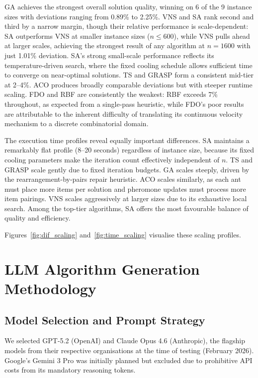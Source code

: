 \documentclass[11pt]{article}
\begin{document}
GA achieves the strongest overall solution quality, winning on 6 of the 9 instance sizes with deviations ranging from 0.89\% to 2.25\%. VNS and SA rank second and third by a narrow margin, though their relative performance is scale-dependent: SA outperforms VNS at smaller instance sizes ($n \leq 600$), while VNS pulls ahead at larger scales, achieving the strongest result of any algorithm at $n = 1600$ with just 1.01\% deviation. SA's strong small-scale performance reflects its temperature-driven search, where the fixed cooling schedule allows sufficient time to converge on near-optimal solutions. TS and GRASP form a consistent mid-tier at 2--4\%. ACO produces broadly comparable deviations but with steeper runtime scaling. FDO and RBF are consistently the weakest: RBF exceeds 7\% throughout, as expected from a single-pass heuristic, while FDO's poor results are attributable to the inherent difficulty of translating its continuous velocity mechanism to a discrete combinatorial domain.

The execution time profiles reveal equally important differences. SA maintains a remarkably flat profile (8--20 seconds) regardless of instance size, because its fixed cooling parameters make the iteration count effectively independent of $n$. TS and GRASP scale gently due to fixed iteration budgets. GA scales steeply, driven by the rearrangement-by-pairs repair heuristic. ACO scales similarly, as each ant must place more items per solution and pheromone updates must process more item pairings. VNS scales aggressively at larger sizes due to its exhaustive local search. Among the top-tier algorithms, SA offers the most favourable balance of quality and efficiency.

Figures~\ref{fig:dif_scaling} and~\ref{fig:time_scaling} visualise these scaling profiles.

\section{LLM Algorithm Generation Methodology}

\subsection{Model Selection and Prompt Strategy}

We selected GPT-5.2 (OpenAI) and Claude Opus 4.6 (Anthropic), the flagship models from their respective organisations at the time of testing (February 2026). Google's Gemini 3 Pro was initially planned but excluded due to prohibitive API costs from its mandatory reasoning tokens.
\end{document}

